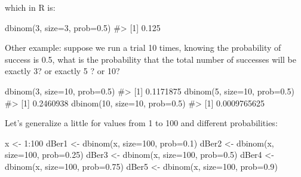 \documentclass[
  letterpaper,
  DIV=11,
  numbers=noendperiod]{scrreprt}
\newenvironment{Shaded}{\begin{snugshade}}{\end{snugshade}}
\newcommand{\AttributeTok}[1]{\textcolor[rgb]{0.40,0.45,0.13}{#1}}
\newcommand{\CommentTok}[1]{\textcolor[rgb]{0.37,0.37,0.37}{#1}}
\newcommand{\DecValTok}[1]{\textcolor[rgb]{0.68,0.00,0.00}{#1}}
\newcommand{\FloatTok}[1]{\textcolor[rgb]{0.68,0.00,0.00}{#1}}
\newcommand{\FunctionTok}[1]{\textcolor[rgb]{0.28,0.35,0.67}{#1}}
\newcommand{\NormalTok}[1]{\textcolor[rgb]{0.00,0.23,0.31}{#1}}
\newcommand{\OtherTok}[1]{\textcolor[rgb]{0.00,0.23,0.31}{#1}}
\newcommand{\SpecialCharTok}[1]{\textcolor[rgb]{0.37,0.37,0.37}{#1}}
\begin{document}
which in R is:

\begin{Shaded}
\begin{Highlighting}[]
\FunctionTok{dbinom}\NormalTok{(}\DecValTok{3}\NormalTok{, }\AttributeTok{size=}\DecValTok{3}\NormalTok{, }\AttributeTok{prob=}\FloatTok{0.5}\NormalTok{)}
\CommentTok{\#\textgreater{} [1] 0.125}
\end{Highlighting}
\end{Shaded}

Other example: suppose we run a trial 10 times, knowing the probability
of success is 0.5, what is the probability that the total number of
successes will be exactly 3? or exactly 5 ? or 10?

\begin{Shaded}
\begin{Highlighting}[]
\FunctionTok{dbinom}\NormalTok{(}\DecValTok{3}\NormalTok{, }\AttributeTok{size=}\DecValTok{10}\NormalTok{, }\AttributeTok{prob=}\FloatTok{0.5}\NormalTok{)}
\CommentTok{\#\textgreater{} [1] 0.1171875}
\FunctionTok{dbinom}\NormalTok{(}\DecValTok{5}\NormalTok{, }\AttributeTok{size=}\DecValTok{10}\NormalTok{, }\AttributeTok{prob=}\FloatTok{0.5}\NormalTok{)}
\CommentTok{\#\textgreater{} [1] 0.2460938}
\FunctionTok{dbinom}\NormalTok{(}\DecValTok{10}\NormalTok{, }\AttributeTok{size=}\DecValTok{10}\NormalTok{, }\AttributeTok{prob=}\FloatTok{0.5}\NormalTok{)}
\CommentTok{\#\textgreater{} [1] 0.0009765625}
\end{Highlighting}
\end{Shaded}

Let's generalize a little for values from 1 to 100 and different
probabilities:

\begin{Shaded}
\begin{Highlighting}[]
\NormalTok{x }\OtherTok{\textless{}{-}} \DecValTok{1}\SpecialCharTok{:}\DecValTok{100}
\NormalTok{dBer1 }\OtherTok{\textless{}{-}} \FunctionTok{dbinom}\NormalTok{(x, }\AttributeTok{size=}\DecValTok{100}\NormalTok{, }\AttributeTok{prob=}\FloatTok{0.1}\NormalTok{)}
\NormalTok{dBer2 }\OtherTok{\textless{}{-}} \FunctionTok{dbinom}\NormalTok{(x, }\AttributeTok{size=}\DecValTok{100}\NormalTok{, }\AttributeTok{prob=}\FloatTok{0.25}\NormalTok{)}
\NormalTok{dBer3 }\OtherTok{\textless{}{-}} \FunctionTok{dbinom}\NormalTok{(x, }\AttributeTok{size=}\DecValTok{100}\NormalTok{, }\AttributeTok{prob=}\FloatTok{0.5}\NormalTok{)}
\NormalTok{dBer4 }\OtherTok{\textless{}{-}} \FunctionTok{dbinom}\NormalTok{(x, }\AttributeTok{size=}\DecValTok{100}\NormalTok{, }\AttributeTok{prob=}\FloatTok{0.75}\NormalTok{)}
\NormalTok{dBer5 }\OtherTok{\textless{}{-}} \FunctionTok{dbinom}\NormalTok{(x, }\AttributeTok{size=}\DecValTok{100}\NormalTok{, }\AttributeTok{prob=}\FloatTok{0.9}\NormalTok{)}
\end{Highlighting}
\end{Shaded}
\end{document}
